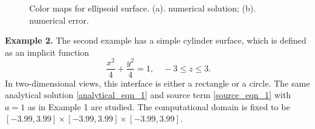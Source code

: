 \documentclass[dissertation]{uathesis}
\begin{document}
\begin{body}
\begin{flushleft}
\begin{figure}[!ht]	
	\begin{center}
	\end{center}
	\caption{Color maps for ellipsoid surface. (a). numerical solution; (b). numerical error.}
	\label{fig:color_map_ellipsoid}
\end{figure} 
%


{\flushleft \bf Example 2.} The second example has a simple cylinder surface, which is defined as an implicit function
% 
\begin{equation} \label{cylinder_eq}
\frac{x^{2}}{4}+\frac{y^{2}}{4}=1 , \quad -3\leqslant z \leqslant3.
\end{equation}
%
In two-dimensional views, this interface is either a rectangle or a circle. 
The same analytical solution \eqref{analytical_eqn_1} and source term \eqref{source_eqn_1} with $a=1$ as in 
Example 1 are studied. 
The computational domain is fixed to be $[-3.99,3.99]\times[-3.99,3.99]\times[-3.99,3.99]$.


\end{flushleft}
\end{body}
\end{document}
